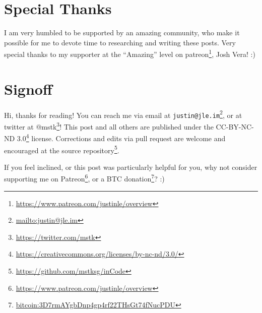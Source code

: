 \documentclass[]{article}
\renewcommand{\href}[2]{#2\footnote{\url{#1}}}
\begin{document}
\section{Special Thanks}\label{special-thanks}

I am very humbled to be supported by an amazing community, who make it possible
for me to devote time to researching and writing these posts. Very special
thanks to my supporter at the ``Amazing'' level on
\href{https://www.patreon.com/justinle/overview}{patreon}, Josh Vera! :)

\section{Signoff}\label{signoff}

Hi, thanks for reading! You can reach me via email at
\href{mailto:justin@jle.im}{\nolinkurl{justin@jle.im}}, or at twitter at
\href{https://twitter.com/mstk}{@mstk}! This post and all others are published
under the \href{https://creativecommons.org/licenses/by-nc-nd/3.0/}{CC-BY-NC-ND
3.0} license. Corrections and edits via pull request are welcome and encouraged
at \href{https://github.com/mstksg/inCode}{the source repository}.

If you feel inclined, or this post was particularly helpful for you, why not
consider \href{https://www.patreon.com/justinle/overview}{supporting me on
Patreon}, or a \href{bitcoin:3D7rmAYgbDnp4gp4rf22THsGt74fNucPDU}{BTC donation}?
:)
\end{document}
